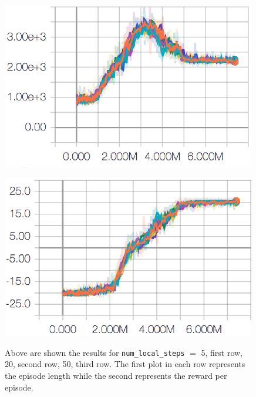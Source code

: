 \begin{figure}[ht]
    
    \begin{minipage}[b]{0.49\textwidth}
    \centering
    \includegraphics[width=0.99\textwidth]{pictures/50_length.eps}
    \label{fig:length50}
    \end{minipage}
    \begin{minipage}[b]{0.49\textwidth}
    \centering
    \includegraphics[width=0.99\textwidth]{pictures/50_reward.eps}
    \label{fig:reward50}
    \end{minipage}
    \caption{Above are shown the results for \texttt{num\_local\_steps} $=$ 5, first row, 20, second row, 50, third row. The first plot in each row represents the episode length while the second represents the reward per episode.}
\end{figure}